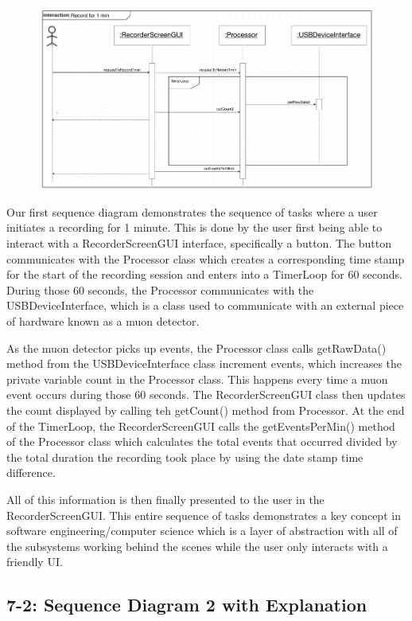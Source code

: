 \documentclass[11pt,a4paper]{article}
\begin{document}
\begin{figure}[h] \centering
	\includegraphics[width=1.08\textwidth]{sequence1.png}
\end{figure}

Our first sequence diagram demonstrates the sequence of tasks where a user initiates a recording for 1 minute. This is done by the user first being able to interact with a RecorderScreenGUI interface, specifically a button. The button communicates with the Processor class which creates a corresponding time stamp for the start of the recording session and enters into a TimerLoop for 60 seconds. During those 60 seconds, the Processor communicates with the USBDeviceInterface, which is a class used to communicate with an external piece of hardware known as a muon detector. 

As the muon detector picks up events, the Processor class calls getRawData() method from the USBDeviceInterface class increment events, which increases the private variable count in the Processor class. This happens every time a muon event occurs during those 60 seconds. The RecorderScreenGUI class then updates the count displayed by calling teh getCount() method from Processor. At the end of the TimerLoop, the RecorderScreenGUI calls the getEventsPerMin() method of the Processor class which calculates the total events that occurred divided by the total duration the recording took place by using the date stamp time difference. 

All of this information is then finally presented to the user in the RecorderScreenGUI. This entire sequence of tasks demonstrates a key concept in software engineering/computer science which is a layer of abstraction with all of the subsystems working behind the scenes while the user only interacts with a friendly UI. 

\newpage
\subsection*{7-2: Sequence Diagram 2 with Explanation}
\end{document}
